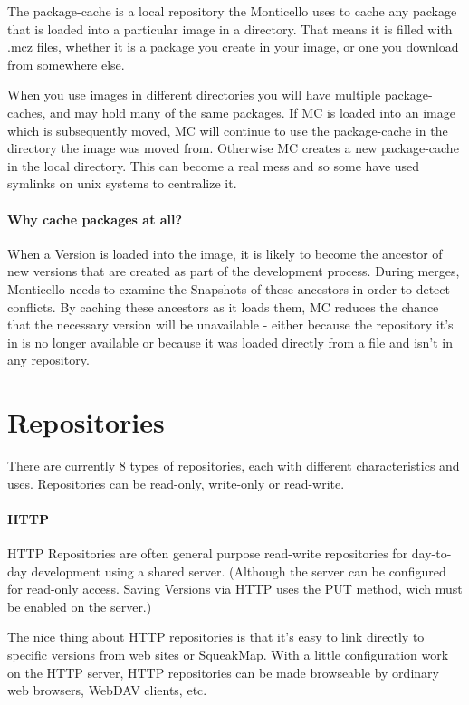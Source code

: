 \documentclass[a4paper,10pt,twoside]{book}
\begin{document}
The package-cache is a local repository the Monticello uses to cache any package that is loaded into a particular image in a directory. That means it is filled with .mcz files, whether it is a package you create in your image, or one you download from somewhere else.

When you use images in different directories you will have multiple package-caches, and may hold many of the same packages. If MC is loaded into an image which is subsequently moved, MC will continue to use the package-cache in the directory the image was moved from. Otherwise MC creates a new package-cache in the local directory. This can become a real mess and so some have used symlinks on unix systems to centralize it.

\paragraph{Why cache packages at all?}

When a Version is loaded into the image, it is likely to become the ancestor of new versions that are created as part of the development process. During merges, Monticello needs to examine the Snapshots of these ancestors in order to detect conflicts. By caching these ancestors as it loads them, MC reduces the chance that the necessary version will be unavailable - either because the repository it's in is no longer available or because it was loaded directly from a file and isn't in any repository.



\section{Repositories}

There are currently 8 types of repositories, each with different characteristics and uses. Repositories can be read-only, write-only or read-write.

\paragraph{HTTP}

HTTP Repositories are often general purpose read-write repositories for day-to-day development using a shared server. (Although the server can be configured for read-only access. Saving Versions via HTTP uses the PUT method, wich must be enabled on the server.)

The nice thing about HTTP repositories is that it's easy to link directly to specific versions from web sites or SqueakMap. With a little configuration work on the HTTP server, HTTP repositories can be made browseable by ordinary web browsers, WebDAV clients, etc.
\end{document}
